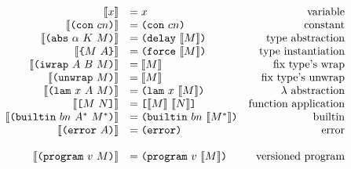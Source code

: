 \documentclass[../plutus-core-specification.tex]{subfiles}
\begin{document}
\begin{minipage}{\linewidth}
    \centering
    \[\begin{array}{rlr}
       \erase{x}                      &= x                            & \textrm{variable}\\
       \erase{\con{cn}}               &= \con{cn}                     & \textrm{constant}\\
       \erase{\abs{\alpha}{K}{M}}     &= \delay{\erase{M}}            & \textrm{type abstraction}\\
       \erase{\inst{M}{A}}            &= \force{\erase{M}}            & \textrm{type instantiation}\\
       \erase{\iwrap{A}{B}{M}}        &= \erase{M}                    & \textrm{fix type's wrap}\\
       \erase{\unwrap{M}}             &= \erase{M}                    & \textrm{fix type's unwrap}\\
       \erase{\lam{x}{A}{M}}          &= \lamU{x}{\erase{M}}          & \textrm{$\lambda$ abstraction}\\
       \erase{\app{M}{N}}             &= \appU{\erase{M}}{\erase{N}}  & \textrm{function application}\\
       \erase{\builtin{bn}{A^*}{M^*}} &= \builtinU{bn}{\erase{M^*}}    & \textrm{builtin}\\
       \erase{\error{A}}              &= \errorU{}                    & \textrm{error}\\
       \\
        \erase{\version{v}{M}}        &= \version{v}{\erase{M}}       & \textrm{versioned program}\\

    \end{array}\]
    \label{fig:type-erasure}
\end{minipage}
\end{document}
